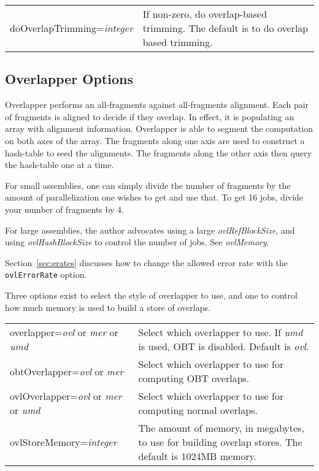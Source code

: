 \documentclass[twoside,11pt]{article}
\begin{document}
\begin{longtable}{lp{3.0in}}
doOverlapTrimming={\it integer} &
If non-zero, do overlap-based trimming.  The default is to do overlap
based trimming.
\\
\end{longtable}


\subsection{Overlapper Options}
\label{sec:overlapopts}

Overlapper performs an all-fragments against all-fragments alignment.
Each pair of fragments is aligned to decide if they overlap.  In
effect, it is populating an array with alignment information.
Overlapper is able to segment the computation on both axes of the
array.  The fragments along one axis are used to construct a
hash-table to seed the alignments.  The fragments along the other axis
then query the hash-table one at a time.

For small assemblies, one can simply divide the number of fragments by
the amount of parallelization one wishes to get and use that.  To get
16 jobs, divide your number of fragments by 4.

For large assemblies, the author advocates using a large {\it
ovlRefBlockSize}, and using {\it ovlHashBlockSize} to control the number of
jobs.  See {\it ovlMemory}.

Section~\ref{sec:erates} discusses how to change the allowed error rate with
the {\tt ovlErrorRate} option.

Three options exist to select the style of overlapper to use, and one to
control how much memory is used to build a store of overlaps.

\begin{longtable}{lp{3.0in}}
overlapper={\em ovl} or {\em mer} or {\em umd} &
Select which overlapper to use.
If {\em umd} is used, OBT is disabled.
Default is {\em ovl}.
\\

obtOverlapper={\em ovl} or {\em mer} &
Select which overlapper to use for computing OBT overlaps.
\\

ovlOverlapper={\em ovl} or {\em mer} or {\em umd} &
Select which overlapper to use for computing normal overlaps.
\\

ovlStoreMemory={\it integer} &
The amount of memory, in megabytes, to use for building overlap
stores.  The default is 1024MB memory.
\\
\end{longtable}
\end{document}
